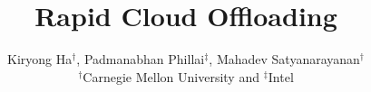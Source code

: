 


\title{\Large \bf 
Rapid Cloud Offloading
}
\author{Kiryong Ha$^{\dagger}$, Padmanabhan Phillai$^{\ddagger}$,  Mahadev Satyanarayanan$^{\dagger}$\\
$^{\dagger}$Carnegie Mellon University and $^{\ddagger}$Intel}
\date{}


\maketitle









\begin{footnotesize}
\setlength{\bibspacing}{\baselineskip}


\end{footnotesize}

